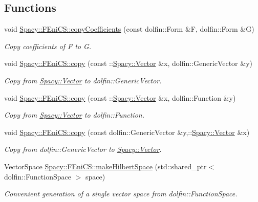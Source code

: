 \subsection*{\-Functions}
\begin{DoxyCompactItemize}
\item 
void \hyperlink{group__FenicsGroup_gab3d4c7c1e91a50e4e816598258b6edce}{\-Spacy\-::\-F\-Eni\-C\-S\-::copy\-Coefficients} (const dolfin\-::\-Form \&\-F, dolfin\-::\-Form \&\-G)
\begin{DoxyCompactList}\small\item\em \-Copy coefficients of \-F to \-G. \end{DoxyCompactList}\item 
void \hyperlink{group__FenicsGroup_ga7f43f0c660d0646adb031b453c536bb0}{\-Spacy\-::\-F\-Eni\-C\-S\-::copy} (const \-::\hyperlink{classSpacy_1_1Vector}{\-Spacy\-::\-Vector} \&x, dolfin\-::\-Generic\-Vector \&y)
\begin{DoxyCompactList}\small\item\em \-Copy from \hyperlink{classSpacy_1_1Vector}{\-Spacy\-::\-Vector} to dolfin\-::\-Generic\-Vector. \end{DoxyCompactList}\item 
void \hyperlink{group__FenicsGroup_ga28fb1ebae29e07ec0256bb2331599aa7}{\-Spacy\-::\-F\-Eni\-C\-S\-::copy} (const \-::\hyperlink{classSpacy_1_1Vector}{\-Spacy\-::\-Vector} \&x, dolfin\-::\-Function \&y)
\begin{DoxyCompactList}\small\item\em \-Copy from \hyperlink{classSpacy_1_1Vector}{\-Spacy\-::\-Vector} to dolfin\-::\-Function. \end{DoxyCompactList}\item 
void \hyperlink{group__FenicsGroup_ga61c5e45dbb789c155fbf86f8ec288f17}{\-Spacy\-::\-F\-Eni\-C\-S\-::copy} (const dolfin\-::\-Generic\-Vector \&y,\-::\hyperlink{classSpacy_1_1Vector}{\-Spacy\-::\-Vector} \&x)
\begin{DoxyCompactList}\small\item\em \-Copy from dolfin\-::\-Generic\-Vector to \hyperlink{classSpacy_1_1Vector}{\-Spacy\-::\-Vector}. \end{DoxyCompactList}\item 
\-Vector\-Space \hyperlink{group__FenicsGroup_ga8b67cb3d0188d2398625595b79e2fa6a}{\-Spacy\-::\-F\-Eni\-C\-S\-::make\-Hilbert\-Space} (std\-::shared\-\_\-ptr$<$ dolfin\-::\-Function\-Space $>$ space)
\begin{DoxyCompactList}\small\item\em \-Convenient generation of a single vector space from dolfin\-::\-Function\-Space. \end{DoxyCompactList}\item 

\end{DoxyCompactItemize}
